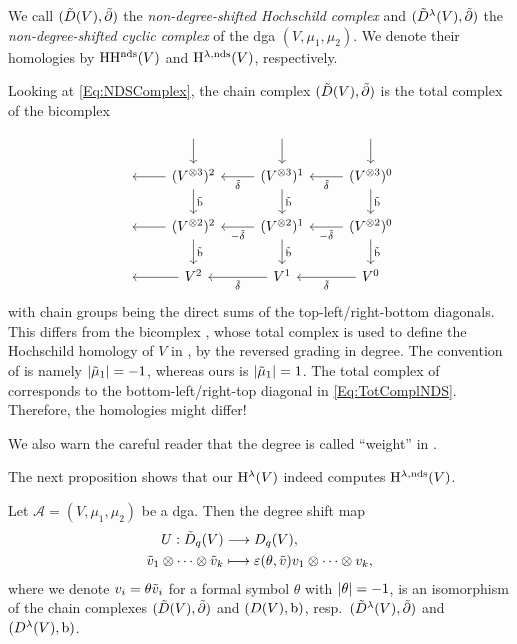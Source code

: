 \documentclass[\MainFolder/Text.tex]{subfiles}
\begin{document}
We call $(\tilde{D}(V),\tilde{\partial})$ the \emph{non-degree-shifted Hochschild complex} and $(\tilde{D}^\lambda(V), \tilde{\partial})$ the \emph{non-degree-shifted cyclic complex} of the dga $(V,\mu_1,\mu_2)$.
We denote their homologies by $\mathrm{H}\mathrm{H}^{\mathrm{nds}}(V)$ and $\mathrm{H}^{\lambda,\mathrm{nds}}(V)$, respectively.

Looking at \eqref{Eq:NDSComplex}, the chain complex $(\tilde{D}(V),\tilde{\partial})$ is the total complex of the bicomplex
\begin{equation}\label{Eq:TotComplNDS}
\begin{tikzcd}
{} & \arrow{d} &\arrow{d} & \arrow{d} \\
{} &\arrow{l} \arrow{d}{\tilde{\Hd}} (V^{\otimes 3})^2 & \arrow{l}{\tilde{\delta}} \arrow{d}{\tilde{\Hd}} (V^{\otimes 3})^1 & \arrow{l}{\tilde{\delta}} \arrow{d}{\tilde{\Hd}} (V^{\otimes 3})^{0}  \\
{} &\arrow{l} \arrow{d}{\tilde{\Hd}} (V^{\otimes 2})^2 & \arrow{l}{-\tilde{\delta}} \arrow{d}{\tilde{\Hd}} (V^{\otimes 2})^1 & \arrow{l}{-\tilde{\delta}} \arrow{d}{\tilde{\Hd}} (V^{\otimes 2})^{0} \\
{} &\arrow{l} V^2 & \arrow{l}{\tilde{\delta}} V^1 & \arrow{l}{\tilde{\delta}} V^{0}
\end{tikzcd}
\end{equation}
with chain groups being the direct sums of the top-left/right-bottom diagonals.
This differs from the bicomplex \cite[Equation (5.3.2.1)]{LodayCyclic}, whose total complex is used to define the Hochschild homology of $V$ in \cite{LodayCyclic}, by the reversed grading in degree.
The convention of \cite{LodayCyclic} is namely $|\tilde{\mu}_1| = -1$, whereas ours is $|\tilde{\mu}_1|=1$.
The total complex of \cite{LodayCyclic} corresponds to the bottom-left/right-top diagonal in \eqref{Eq:TotComplNDS}.
Therefore, the homologies might differ!

We also warn the careful reader that the degree is called ``weight'' in \cite{LodayCyclic}.

The next proposition shows that our $\mathrm{H}^{\lambda}(V)$ indeed computes $\mathrm{H}^{\lambda,\mathrm{nds}}(V)$.

\begin{Proposition} \label{Prop:DGA}
Let $\mathcal{A} = (V,\mu_1,\mu_2)$ be a dga. Then the degree shift map
\begin{align*} 
 U: \tilde{D}_q (V) & \longrightarrow D_q(V), \\
        \tilde{v}_1 \otimes \dotsb \otimes \tilde{v}_k & \longmapsto \varepsilon(\theta, \tilde{v}) v_1 \otimes \dotsb \otimes v_k,  \end{align*}
where we denote $v_i = \theta \tilde{v}_i$ for a formal symbol $\theta$ with $|\theta|=-1$, is an isomorphism of the chain complexes $(\tilde{D}(V),\tilde{\partial})$ and $(D(V), \mathrm{b})$, resp.~$(\tilde{D}^\lambda(V),\tilde{\partial})$ and $(D^\lambda(V),\mathrm{b})$.
\end{Proposition}
   
\end{document}
